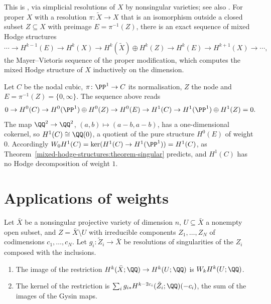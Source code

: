 This is \cite{deligne-hodge-3}, via simplicial resolutions of $X$ by nonsingular varieties; see also \cite[Chapter 5]{peters-steenbrink}. For proper $X$ with a resolution $\pi \colon \tilde X \to X$ that is an
isomorphism outside a closed subset $Z \subseteq X$ with preimage $E = \pi^{-1}(Z)$, there is an exact sequence of mixed Hodge structures
\[
\cdots \to H^{k-1}(E) \to H^k(X) \to H^k(\tilde X) \oplus H^k(Z) \to H^k(E) \to H^{k+1}(X) \to \cdots,
\]
the Mayer--Vietoris sequence of the proper modification, which computes the mixed Hodge structure of $X$ inductively on the dimension.

\begin{example}\label{mixed-hodge-structures:example-nodal}
Let $C$ be the nodal cubic, $\pi \colon \PP^1 \to C$ its normalisation, $Z$ the node and $E = \pi^{-1}(Z) = \{0, \infty\}$. The sequence above reads
\[
0 \to H^0(C) \to H^0(\PP^1) \oplus H^0(Z) \to H^0(E) \to H^1(C) \to H^1(\PP^1) \oplus H^1(Z) = 0.
\]
The map $\QQ^2 \to \QQ^2$, $(a, b) \mapsto (a - b, a - b)$, has a one-dimensional cokernel, so $H^1(C) \cong \QQ(0)$, a quotient of the pure structure $H^0(E)$ of weight $0$. Accordingly
$W_0H^1(C) = \ker(H^1(C) \to H^1(\PP^1)) = H^1(C)$, as Theorem~\ref{mixed-hodge-structures:theorem-singular} predicts, and $H^1(C)$ has no Hodge decomposition of weight $1$.
\end{example}

\section{Applications of weights}\label{mixed-hodge-structures:section-applications}

\begin{corollary}\label{mixed-hodge-structures:corollary-restriction}
Let $\bar X$ be a nonsingular projective variety of dimension $n$, $U \subseteq \bar X$ a nonempty open subset, and $Z = \bar X \setminus U$ with irreducible components $Z_1, \ldots, Z_N$ of codimensions
$c_1, \ldots, c_N$. Let $g_i \colon \tilde Z_i \to \bar X$ be resolutions of singularities of the $Z_i$ composed with the inclusions.
\begin{enumerate}
\item The image of the restriction $H^k(\bar X; \QQ) \to H^k(U; \QQ)$ is $W_kH^k(U; \QQ)$.
\item The kernel of the restriction is $\sum_ig_{i*}H^{k-2c_i}(\tilde Z_i; \QQ)(-c_i)$, the sum of the images of the Gysin maps.
\end{enumerate}
\end{corollary}

